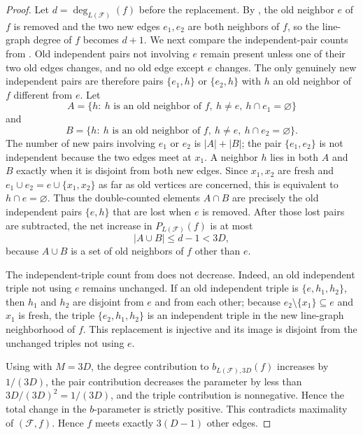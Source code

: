 \begin{proof}
Let $d=\deg_{L(\mathcal F)}(f)$ before the replacement.  By
, the old neighbor $e$ of $f$ is removed and
the two new edges $e_1,e_2$ are both neighbors of $f$, so the line-graph
degree of $f$ becomes $d+1$.  We next compare the independent-pair counts
from .  Old independent pairs not involving
$e$ remain present unless one of their two old edges changes, and no old edge
except $e$ changes.  The only genuinely new independent pairs are therefore
pairs $\{e_1,h\}$ or $\{e_2,h\}$ with $h$ an old neighbor of $f$ different
from $e$.  Let
\[
A=\{h:\ h\text{ is an old neighbor of }f,\ h\ne e,\ h\cap e_1=\varnothing\}
\]
and
\[
B=\{h:\ h\text{ is an old neighbor of }f,\ h\ne e,\ h\cap e_2=\varnothing\}.
\]
The number of new pairs involving $e_1$ or $e_2$ is $|A|+|B|$; the pair
$\{e_1,e_2\}$ is not independent because the two edges meet at $x_1$.  A
neighbor $h$ lies in both $A$ and $B$ exactly when it is disjoint from both
new edges.  Since $x_1,x_2$ are fresh and
$e_1\cup e_2=e\cup\{x_1,x_2\}$ as far as old vertices are concerned, this is
equivalent to $h\cap e=\varnothing$.  Thus the double-counted elements
$A\cap B$ are precisely the old independent pairs $\{e,h\}$ that are lost
when $e$ is removed.  After those lost pairs are subtracted, the net increase
in $P_{L(\mathcal F)}(f)$ is at most
\[
|A\cup B|\le d-1<3D,
\]
because $A\cup B$ is a set of old neighbors of $f$ other than $e$.

The independent-triple count from  does not
decrease.  Indeed, an old independent triple not using $e$ remains unchanged.
If an old independent triple is $\{e,h_1,h_2\}$, then $h_1$ and $h_2$ are
disjoint from $e$ and from each other; because $e_2\setminus\{x_1\}\subseteq e$
and $x_1$ is fresh, the triple $\{e_2,h_1,h_2\}$ is an independent triple in
the new line-graph neighborhood of $f$.  This replacement is injective and its
image is disjoint from the unchanged triples not using $e$.

Using  with $M=3D$, the degree contribution to
$b_{L(\mathcal F),3D}(f)$ increases by $1/(3D)$, the pair contribution
decreases the parameter by less than $3D/(3D)^2=1/(3D)$, and the triple
contribution is nonnegative.  Hence the total change in the $b$-parameter is
strictly positive.  This contradicts maximality of $(\mathcal F,f)$.  Hence
$f$ meets exactly $3(D-1)$ other edges.
\end{proof}
